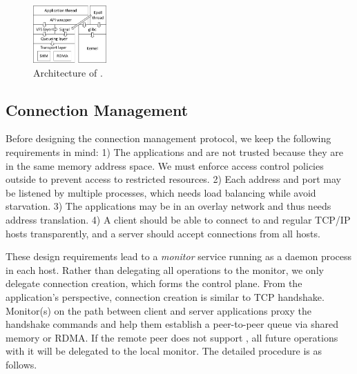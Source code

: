 

\begin{figure}[t!]
	\centering
	\includegraphics[width=0.25\textwidth]{images/libsd_architecture}
	\vspace{-5pt}
	\caption{Architecture of \libipc{}.}
	\label{fig:libsd-architecture}
\end{figure}


\subsection{Connection Management}
\label{subsec:connection-management}

Before designing the connection management protocol, we keep the following requirements in mind:
1) The applications and \libipc{} are not trusted because they are in the same memory address space. We must enforce access control policies outside \libipc{} to prevent access to restricted resources.
2) Each address and port may be listened by multiple processes, which needs load balancing while avoid starvation.
3) The applications may be in an overlay network and thus needs address translation. 
4) A client should be able to connect to \sys{} and regular TCP/IP hosts transparently, and a server should accept connections from all hosts.

These design requirements lead to a \emph{monitor} service running as a daemon process in each host.
Rather than delegating all operations to the monitor, we only delegate connection creation, which forms the control plane.
From the application's perspective, connection creation is similar to TCP handshake.
Monitor(s) on the path between client and server applications proxy the handshake commands and help them establish a peer-to-peer queue via shared memory or RDMA.
If the remote peer does not support \sys{}, all future operations with it will be delegated to the local monitor.
The detailed procedure is as follows.


